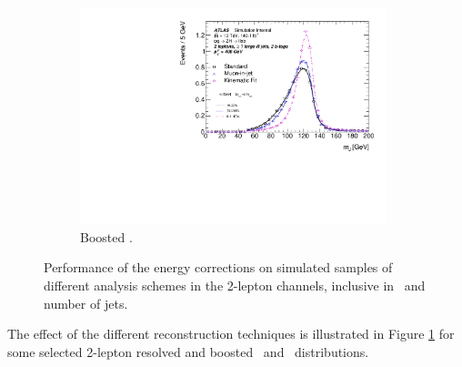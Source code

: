 \begin{figure}[h!]
\begin{subfigure}[b]{0.49\textwidth}
    \includegraphics[width=0.98\textwidth]{Images/VH/Correct/CorrectedDist/c_niceMbb_qqZllH125_2tag1pfat_400ptv.pdf}
    \caption{Boosted \vhb.}
  \end{subfigure}
  \caption{Performance of the energy corrections on simulated samples of different analysis schemes in the 2-lepton channels, inclusive in \ptv\ and number of jets.}
  \label{fig:CorrResults}
\end{figure} 

The effect of the different reconstruction techniques is illustrated in Figure \ref{fig:CorrResults} for some selected 2-lepton resolved and boosted \vhb\ and \vhc\ distributions.
